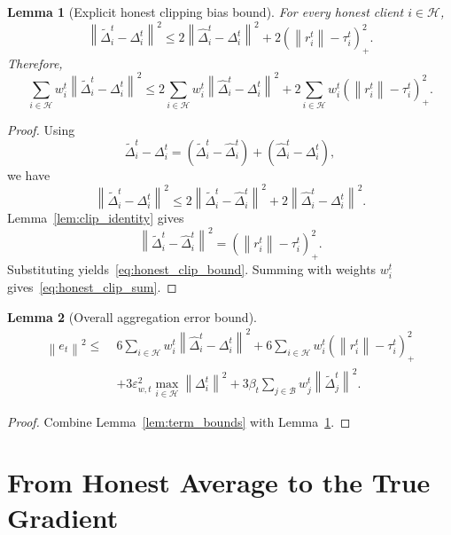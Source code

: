 \documentclass[11pt,a4paper]{article}
\newtheorem{lemma}{Lemma}
\theoremstyle{remark}
\newcommand{\HH}{\mathcal{H}}
\newcommand{\BB}{\mathcal{B}}
\newcommand{\norm}[1]{\left\lVert #1 \right\rVert}
\begin{document}
\begin{lemma}[Explicit honest clipping bias bound]
\label{lem:honest_clip}
For every honest client \(i \in \HH\),
\begin{equation}
    \norm{\tilde{\Delta}_i^t-\Delta_i^t}^2
    \le
    2\norm{\hat{\Delta}_i^t-\Delta_i^t}^2
    +
    2(\norm{r_i^t}-\tau_i^t)_+^2.
    \label{eq:honest_clip_bound}
\end{equation}
Therefore,
\begin{equation}
    \sum_{i \in \HH} w_i^t \norm{\tilde{\Delta}_i^t-\Delta_i^t}^2
    \le
    2\sum_{i \in \HH} w_i^t \norm{\hat{\Delta}_i^t-\Delta_i^t}^2
    +
    2\sum_{i \in \HH} w_i^t (\norm{r_i^t}-\tau_i^t)_+^2.
    \label{eq:honest_clip_sum}
\end{equation}
\end{lemma}

\begin{proof}
Using
\[
    \tilde{\Delta}_i^t-\Delta_i^t
    =
    (\tilde{\Delta}_i^t-\hat{\Delta}_i^t)
    +
    (\hat{\Delta}_i^t-\Delta_i^t),
\]
we have
\[
    \norm{\tilde{\Delta}_i^t-\Delta_i^t}^2
    \le
    2\norm{\tilde{\Delta}_i^t-\hat{\Delta}_i^t}^2
    +
    2\norm{\hat{\Delta}_i^t-\Delta_i^t}^2.
\]
Lemma~\ref{lem:clip_identity} gives
\[
    \norm{\tilde{\Delta}_i^t-\hat{\Delta}_i^t}^2
    =
    (\norm{r_i^t}-\tau_i^t)_+^2.
\]
Substituting yields~\eqref{eq:honest_clip_bound}. Summing with weights
\(w_i^t\) gives~\eqref{eq:honest_clip_sum}.
\end{proof}

\begin{lemma}[Overall aggregation error bound]
\label{lem:agg_bound}
\begin{align}
    \norm{e_t}^2
    \le\;&
    6\sum_{i \in \HH} w_i^t \norm{\hat{\Delta}_i^t-\Delta_i^t}^2
    +
    6\sum_{i \in \HH} w_i^t (\norm{r_i^t}-\tau_i^t)_+^2
    \nonumber\\
    &+
    3\varepsilon_{w,t}^2 \max_{i\in\HH}\norm{\Delta_i^t}^2
    +
    3\beta_t \sum_{j\in\BB} w_j^t \norm{\tilde{\Delta}_j^t}^2.
    \label{eq:agg_error_final}
\end{align}
\end{lemma}

\begin{proof}
Combine Lemma~\ref{lem:term_bounds} with
Lemma~\ref{lem:honest_clip}.
\end{proof}

\section{From Honest Average to the True Gradient}
\end{document}
